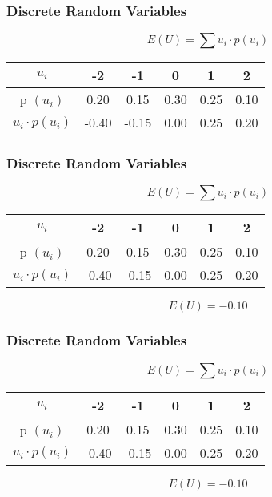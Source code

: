 \documentclass{beamer}
\begin{document}
\begin{frame}
\frametitle{Discrete Random Variables}
\Large
\vspace{-1.5cm}
\[ E(U) =  \sum  u_i \cdot p(u_i)   \]
\begin{center}
\begin{tabular}{|c|c|c|c|c|c|}
\hline $u_i$ & -2 & -1  & 0 & 1 & 2 \\ 
\hline p $(u_i)$ & \phantom{s}0.20\phantom{s} & \phantom{s}0.15\phantom{s}  & \phantom{s}0.30\phantom{s}  & \phantom{s}0.25\phantom{s} & \phantom{s}0.10\phantom{s} \\ 
\hline 
$u_i \cdot p (u_i)$ & -0.40 & -0.15 & 0.00 & 0.25 & 0.20 \\\hline
\end{tabular} 


\end{center}


\end{frame}
\begin{frame}
\frametitle{Discrete Random Variables}
\Large
\vspace{-1.5cm}
\[ E(U) =  \sum  u_i \cdot p(u_i)   \]
\begin{center}
\begin{tabular}{|c|c|c|c|c|c|}
\hline $u_i$ & -2 & -1  & 0 & 1 & 2 \\ 
\hline p $(u_i)$ & \phantom{s}0.20\phantom{s} & \phantom{s}0.15\phantom{s}  & \phantom{s}0.30\phantom{s}  & \phantom{s}0.25\phantom{s} & \phantom{s}0.10\phantom{s} \\ 
\hline 
$u_i \cdot p (u_i)$ & -0.40 & -0.15 & 0.00 & 0.25 & 0.20 \\\hline
\end{tabular} 


\end{center}

\[E(U) = -0.10\]
\end{frame}


\begin{frame}
\frametitle{Discrete Random Variables}
\Large
\vspace{-1.5cm}
\[ E(U) =  \sum  u_i \cdot p(u_i)   \]
\begin{center}
\begin{tabular}{|c|c|c|c|c|c|}
\hline $u_i$ & -2 & -1  & 0 & 1 & 2 \\ 
\hline p $(u_i)$ & \phantom{s}0.20\phantom{s} & \phantom{s}0.15\phantom{s}  & \phantom{s}0.30\phantom{s}  & \phantom{s}0.25\phantom{s} & \phantom{s}0.10\phantom{s} \\ 
\hline 
$u_i \cdot p (u_i)$ & -0.40 & -0.15 & 0.00 & 0.25 & 0.20 \\\hline
\end{tabular} 


\end{center}

\[E(U) = -0.10\]
\end{frame}
\end{document}
